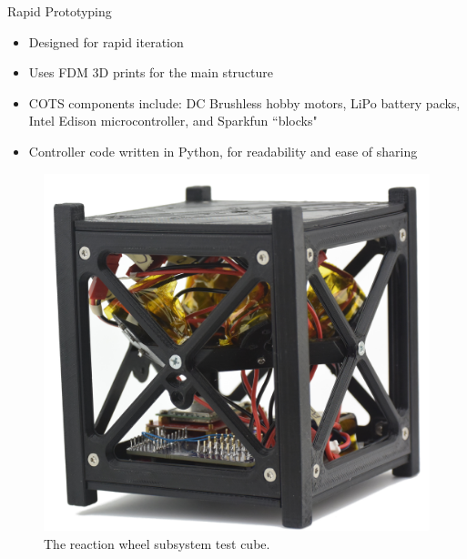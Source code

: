 \documentclass[slidestop,compress]{beamer}
\begin{document}
\begin{frame}[plain]
\begin{block}{\centering Rapid Prototyping}
\hspace{1 mm}
\begin{itemize}
\item Designed for rapid iteration
\item Uses FDM 3D prints for the main structure
\item COTS components include: DC Brushless hobby motors, LiPo battery packs, Intel Edison microcontroller, and Sparkfun ``blocks"
\item Controller code written in Python, for readability and ease of sharing
\end{itemize}
\begin{figure}[!ht]
\centering
{\includegraphics[width=0.7\linewidth]{DSC_1415.JPG}
\caption{The reaction wheel subsystem test cube.}
} 
\end{figure}
\end{block}    
\end{frame}
\end{document}
